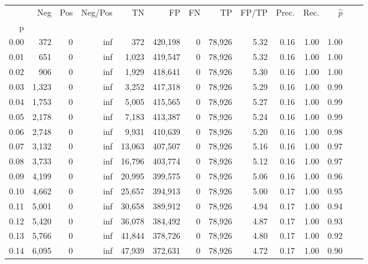 \begin{tabular}{rrrrrrrrrrrrrr}
\toprule
{} &    Neg &    Pos &  Neg/Pos &       TN &       FP &      FN &      TP & FP/TP & Prec. &  Rec. & $\hat{p}$ \\
p    &        &        &          &          &          &         &         &       &       &       &           \\
\midrule
0.00 &    372 &      0 &      inf &      372 &  420,198 &       0 &  78,926 &  5.32 &  0.16 &  1.00 &      1.00 \\
0.01 &    651 &      0 &      inf &    1,023 &  419,547 &       0 &  78,926 &  5.32 &  0.16 &  1.00 &      1.00 \\
0.02 &    906 &      0 &      inf &    1,929 &  418,641 &       0 &  78,926 &  5.30 &  0.16 &  1.00 &      1.00 \\
0.03 &  1,323 &      0 &      inf &    3,252 &  417,318 &       0 &  78,926 &  5.29 &  0.16 &  1.00 &      0.99 \\
0.04 &  1,753 &      0 &      inf &    5,005 &  415,565 &       0 &  78,926 &  5.27 &  0.16 &  1.00 &      0.99 \\
0.05 &  2,178 &      0 &      inf &    7,183 &  413,387 &       0 &  78,926 &  5.24 &  0.16 &  1.00 &      0.99 \\
0.06 &  2,748 &      0 &      inf &    9,931 &  410,639 &       0 &  78,926 &  5.20 &  0.16 &  1.00 &      0.98 \\
0.07 &  3,132 &      0 &      inf &   13,063 &  407,507 &       0 &  78,926 &  5.16 &  0.16 &  1.00 &      0.97 \\
0.08 &  3,733 &      0 &      inf &   16,796 &  403,774 &       0 &  78,926 &  5.12 &  0.16 &  1.00 &      0.97 \\
0.09 &  4,199 &      0 &      inf &   20,995 &  399,575 &       0 &  78,926 &  5.06 &  0.16 &  1.00 &      0.96 \\
0.10 &  4,662 &      0 &      inf &   25,657 &  394,913 &       0 &  78,926 &  5.00 &  0.17 &  1.00 &      0.95 \\
0.11 &  5,001 &      0 &      inf &   30,658 &  389,912 &       0 &  78,926 &  4.94 &  0.17 &  1.00 &      0.94 \\
0.12 &  5,420 &      0 &      inf &   36,078 &  384,492 &       0 &  78,926 &  4.87 &  0.17 &  1.00 &      0.93 \\
0.13 &  5,766 &      0 &      inf &   41,844 &  378,726 &       0 &  78,926 &  4.80 &  0.17 &  1.00 &      0.92 \\
0.14 &  6,095 &      0 &      inf &   47,939 &  372,631 &       0 &  78,926 &  4.72 &  0.17 &  1.00 &      0.90 \\

\end{tabular}
